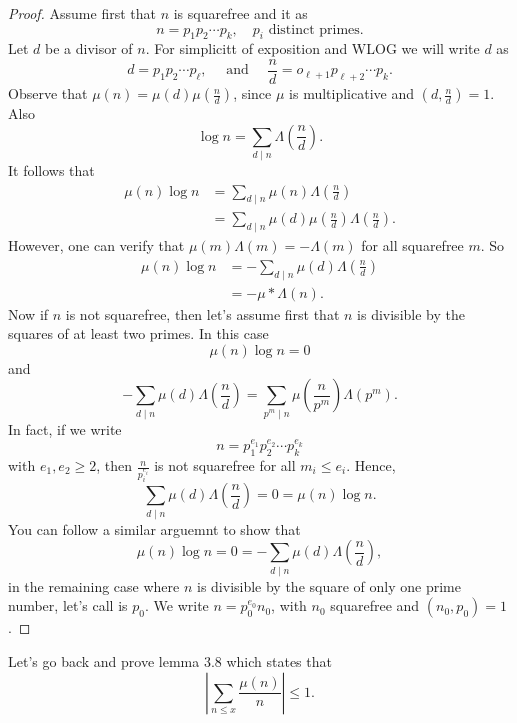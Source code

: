 \documentclass[twoside, openright, fontsize=10pt, headings=big]{scrbook}
\begin{document}
\begin{proof}
    Assume first that $n$ is squarefree and it as
    \[
        n=p_1p_2\cdots p_k,\quad p_i\text{ distinct primes}.
    \]
    Let $d$ be a divisor of $n$. For simplicitt of exposition and WLOG we will write $d$ as
    \[
        d=p_1p_2\cdots p_\ell,\quad\text{ and }\quad \frac{n}{d}=o_{\ell+1}p_{\ell+2}\cdots p_{k}.
    \]
    Observe that $\mu(n)=\mu(d)\mu\left(\frac{n}{d}\right)$, since $\mu$ is multiplicative and $\left(d,\frac{n}{d}\right)=1$. Also 
    \[
        \log n=\sum_{d\mid n}\Lambda\left(\frac{n}{d}\right).
    \]
    It follows that
    \begin{align*}
        \mu(n)\log n&=\sum_{d\mid n}\mu(n)\Lambda\left(\frac{n}{d}\right)\\
        &=\sum_{d\mid n}\mu(d)\mu\left(\frac{n}{d}\right)\Lambda\left(\frac{n}{d}\right).   
    \end{align*}
    However, one can verify that $\mu(m)\Lambda(m)=-\Lambda(m)$ for all squarefree $m$. So 
    \begin{align*}
        \mu(n)\log n&=-\sum_{d\mid n}\mu(d)\Lambda\left(\frac{n}{d}\right)\\
        &=-\mu\ast\Lambda(n).
    \end{align*}
    Now if $n$ is not squarefree, then let's assume first that $n$ is divisible by the squares of at least two primes. In this case
    \[
        \mu(n)\log n=0
    \]
    and
    \[
        -\sum_{d\mid n}\mu(d)\Lambda\left(\frac{n}{d}\right)=\sum_{p^m\mid n}\mu\left(\frac{n}{p^m}\right)\Lambda(p^m).
    \]
    In fact, if we write 
    \[
        n=p_1^{e_1}p_2^{e_2}\cdots p_k^{e_k}
    \]
    with $e_1,e_2\geq2$, then $\frac{n}{p_i^{e_i}}$ is not squarefree for all $m_i\leq e_i$. Hence, 
    \[
        \sum_{d\mid n}\mu(d)\Lambda\left(\frac{n}{d}\right)=0=\mu(n)\log n.
    \]
    You can follow a similar arguemnt to show that
    \[
        \mu(n)\log n=0=-\sum_{d\mid n}\mu(d)\Lambda\left(\frac{n}{d}\right),
    \]
    in the remaining case where $n$ is divisible by the square of only one prime number, let's call is $p_0$. We write $n=p_0^{e_0}n_0$, with $n_0$ squarefree and $(n_0,p_0)=1$.
\end{proof}
Let's go back and prove lemma 3.8 which states that
\[
    \left|\sum_{n\leq x}\frac{\mu(n)}{n}\right|\leq1.
\]
\end{document}

